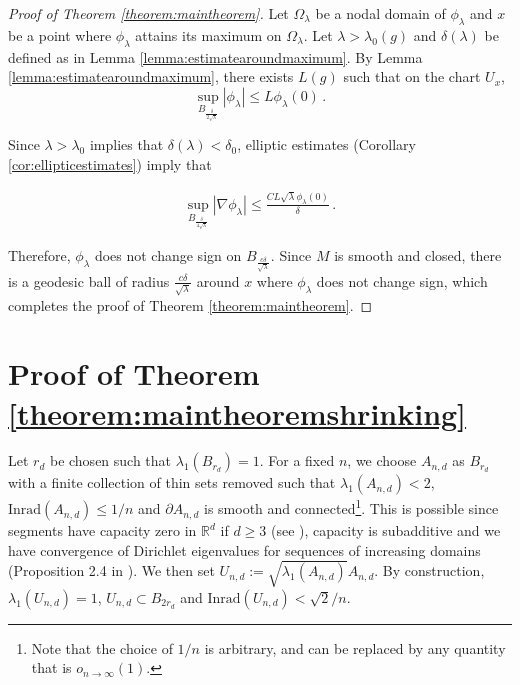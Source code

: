 \documentclass{amsart}
\begin{document}
\begin{proof}[Proof of Theorem \ref{theorem:maintheorem}]
    Let $\Omega_\lambda$ be a nodal domain of $\phi_\lambda$ and $x$ be a point where $\phi_\lambda$ attains its maximum on $\Omega_\lambda$. Let $\lambda >\lambda_0(g)$ and $\delta(\lambda)$ be defined as in Lemma \ref{lemma:estimatearoundmaximum}.
     By Lemma \ref{lemma:estimatearoundmaximum}, there exists $L(g)$ such that on the chart $U_x$, $$\sup\limits_{B_{\frac{\delta}{2 \sqrt{\lambda}}}} |\phi_\lambda| \leq L\phi_\lambda(0) \, .$$

    Since $\lambda > \lambda_0$ implies that $\delta(\lambda)<\delta_0$, elliptic estimates (Corollary \ref{cor:ellipticestimates}) imply that

    \begin{align}
        \sup\limits_{B_{\frac{\delta}{4 \sqrt{\lambda}}}}|\nabla \phi_\lambda| \leq \frac{C L\sqrt{\lambda}\phi_\lambda(0)}{\delta} \, .
    \end{align}

Therefore, $\phi_\lambda$ does not change sign on $B_{\frac{c \delta}{\sqrt{\lambda}}}$. Since $M$ is smooth and closed, there is a geodesic ball of radius $\frac{c \delta}{\sqrt{\lambda}}$ around $x$ where $\phi_\lambda$ does not change sign, which completes the proof of Theorem \ref{theorem:maintheorem}.
    
    
    
    \end{proof}


\section{Proof of Theorem \ref{theorem:maintheoremshrinking}}\label{section:proofofshrinking}

Let $r_d$ be chosen such that $\lambda_1(B_{r_d}) = 1$. For a fixed $n$, we choose $A_{n,d}$ as $B_{r_d}$ with a finite collection of thin sets removed such that $\lambda_1(A_{n,d}) < 2$, $\text{Inrad}(A_{n,d}) \leq 1/n$ and $\partial A_{n,d}$ is smooth and connected\footnote{Note that the choice of $1/n$ is arbitrary, and can be replaced by any quantity that is $o_{n \to \infty}(1).$}. This is possible since segments have capacity zero in $\mathbb R^d$ if $d \geq 3$ (see \cite{rau-tay}), capacity is subadditive and we have convergence of Dirichlet eigenvalues for sequences of increasing domains (Proposition 2.4 in \cite{ber-col}). We then set $U_{n,d}:= \sqrt{\lambda_1(A_{n,d})} A_{n,d}$. By construction, $\lambda_1(U_{n,d})=1$, $U_{n,d} \subset B_{2r_d}$ and $\text{Inrad}(U_{n,d})< \sqrt{2}/n$.
\end{document}
